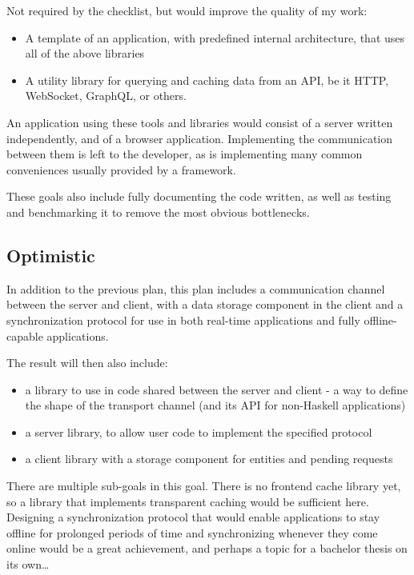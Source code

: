 \documentclass[11pt,a4paper]{scrartcl}
\begin{document}
Not required by the checklist, but would improve the quality of my work:
\begin{itemize}
\item A template of an application, with predefined internal architecture, that uses
all of the above libraries
\item A utility library for querying and caching data from an API, be it HTTP, WebSocket,
GraphQL, or others.
\end{itemize}

An application using these tools and libraries would consist of a server written
independently, and of a browser application. Implementing the communication
between them is left to the developer, as is implementing many common
conveniences usually provided by a framework.

These goals also include fully documenting the code written, as well as testing
and benchmarking it to remove the most obvious bottlenecks.

\subsection{Optimistic}
\label{sec:org48d561d}
In addition to the previous plan, this plan includes a communication channel
between the server and client, with a data storage component in the client and a
synchronization protocol for use in both real-time applications and fully
offline-capable applications.

The result will then also include:
\begin{itemize}
\item a library to use in code shared between the server and client - a way to
define the shape of the transport channel (and its API for non-Haskell
applications)
\item a server library, to allow user code to implement the specified protocol
\item a client library with a storage component for entities and pending requests
\end{itemize}

There are multiple sub-goals in this goal. There is no frontend cache library
yet, so a library that implements transparent caching would be sufficient
here. Designing a synchronization protocol that would enable applications to
stay offline for prolonged periods of time and synchronizing whenever they come
online would be a great achievement, and perhaps a topic for a bachelor thesis
on its own\ldots{}
\end{document}
